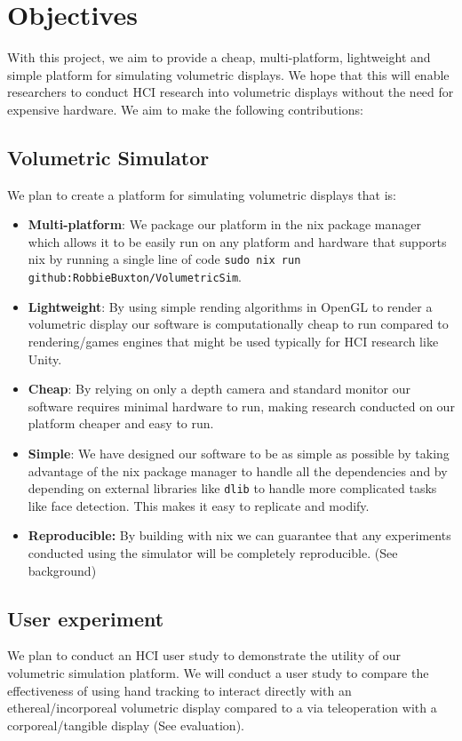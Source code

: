 \section{Objectives}

With this project, we aim to provide a cheap, multi-platform, lightweight and simple platform for simulating volumetric displays. We hope that this will enable researchers to conduct HCI research into volumetric displays without the need for expensive hardware. We aim to make the following contributions:
\subsection{Volumetric Simulator}
We plan to create a platform for simulating volumetric displays that is:
\begin{itemize}
  \item \textbf{Multi-platform}: We package our platform in the nix package manager \cite{dolstra2004nix} which allows it to be easily run on any platform and hardware that supports nix by running a single line of code \texttt{sudo nix run github:RobbieBuxton/VolumetricSim}.

  \item \textbf{Lightweight}: By using simple rending algorithms in OpenGL \cite{rost2009opengl} to render a volumetric display our software is computationally cheap to run compared to rendering/games engines that might be used typically for HCI research like Unity.

  \item \textbf{Cheap}: By relying on only a depth camera and standard monitor our software requires minimal hardware to run, making research conducted on our platform cheaper and easy to run.

  \item \textbf{Simple}: We have designed our software to be as simple as possible by taking advantage of the nix package manager to handle all the dependencies and by depending on external libraries like \texttt{dlib} \cite{10.5555/1577069.1755843} to handle more complicated tasks like face detection. This makes it easy to replicate and modify.

  \item \textbf{Reproducible:} By building with nix we can guarantee that any experiments conducted using the simulator will be completely reproducible. (See background)
\end{itemize}

\subsection{User experiment}
We plan to conduct an HCI user study to demonstrate the utility of our volumetric simulation platform. We will conduct a user study to compare the effectiveness of using hand tracking to interact directly with an ethereal/incorporeal volumetric display compared to a via teleoperation with a corporeal/tangible display (See evaluation).
